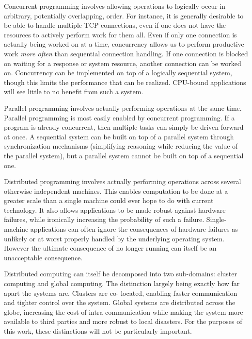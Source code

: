 \documentclass[10pt,a4paper,twocolumn]{article}
\begin{document}
Concurrent programming involves allowing operations to logically occur in
arbitrary, potentially overlapping, order. For instance, it is generally
desirable to be able to handle multiple TCP connections, even if one does not
have the resources to actively perform work for them all. Even if only one
connection is actually being worked on at a time, concurrency allows us to
perform productive work \emph{more often} than sequential connection handling.
If one connection is blocked on waiting for a response or system resource,
another connection can be worked on. Concurrency can be implemented on top of a
logically sequential system, though this limits the performance that can be
realized. CPU-bound applications will see little to no benefit from such a
system.

Parallel programming involves actually performing operations at the same time.
Parallel programming is most easily enabled by concurrent programming. If a
program is already concurrent, then multiple tasks can simply be driven forward
at once. A sequential system can be built on top of a parallel system through
synchronization mechanisms (simplifying reasoning while reducing the value of
the parallel system), but a parallel system cannot be built on top of a
sequential one.

Distributed programming involves actually performing operations across several
otherwise independent machines. This enables computation to be done at a
greater scale than a single machine could ever hope to do with current
technology. It also allows applications to be made robust against hardware
failures, while ironically increasing the probability of such a failure.
Single- machine applications can often ignore the consequences of hardware
failures as unlikely or at worst properly handled by the underlying operating
system. However the ultimate consequence of no longer running can itself be an
unacceptable consequence.

Distributed computing can itself be decomposed into two sub-domains: cluster
computing and global computing. The distinction largely being exactly how far
apart the systems are. Clusters are co- located, enabling faster communication
and tighter control over the system. Global systems are distributed across the
globe, increasing the cost of intra-communication while making the system more
available to third parties and more robust to local disasters. For the purposes
of this work, these distinctions will not be particularly important.
\end{document}
